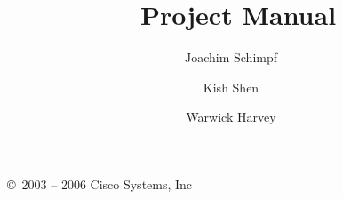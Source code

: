 %
% 
% 
% 
% 





\makeindex



\title{{\Huge \eclipse\ Project Manual}}
\author{
Joachim Schimpf
\and Kish Shen
\and Warwick Harvey
}

\maketitle

\setcounter{page}{2}
\pagestyle{empty}

\vfill

\copyright\ 2003 -- 2006 Cisco Systems, Inc

\bigskip\bigskip\bigskip\bigskip\bigskip\bigskip

\cleardoublepage
\pagestyle{plain}

\begin{latexonly}
\tableofcontents
\end{latexonly}

\cleardoublepage
{}




\newpage

\newpage



